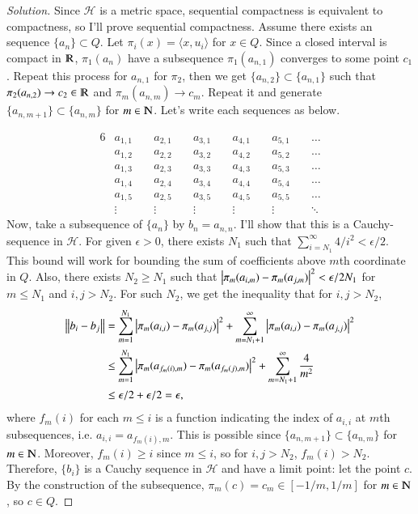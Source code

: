 \documentclass[a4paper, 12pt]{article}
\theoremstyle{Mydefinition}
\theoremstyle{Mytheorem}
\begin{document}
\begin{proof}[Solution]
Since $\mathscr{H}$ is a metric space, sequential compactness is equivalent to compactness, so I'll prove sequential compactness. Assume there exists an sequence $\{a_n\}\subset Q$. Let $\pi_i (x) = \langle x, u_i\rangle$ for $x\in Q$. Since a closed interval is compact in $\varmathbb{R}$, $\pi_1(a_n)$ have a subsequence $\pi_1(a_{n,1})$ converges to some point $c_1$. Repeat this process for $a_{n,1}$ for $\pi_2$, then we get $\{a_{n,2}\}\subset \{a_{n,1}\}$ such that $\pi_2(a_{n,2})\rightarrow c_2\in \varmathbb{R}$ and $\pi_m(a_{n,m})\rightarrow c_m$. Repeat it and generate $\{a_{n,m+1}\}\subset \{a_{n,m}\}$ for $m\in\varmathbb{N}$. Let's write each sequences as below.

\begin{alignat*}{6}
& a_{1,1} & \;& a_{2,1} &\;& a_{3,1} &\;& a_{4,1} &\;& a_{5,1} &\;& \ldots \\
& a_{1,2} &\; & a_{2,2} &\;& a_{3,2} &\;& a_{4,2} &\;& a_{5,2} &\;& \ldots \\
& a_{1,3} &\; & a_{2,3} &\;& a_{3,3} &\;& a_{4,3} &\;& a_{5,3} &\;& \ldots \\
& a_{1,4} &\; & a_{2,4} &\;& a_{3,4} &\;& a_{4,4} &\;& a_{5,4} &\;& \ldots \\
& a_{1,5} &\; & a_{2,5} &\;& a_{3,5} &\;& a_{4,5} &\;& a_{5,5} &\;& \ldots \\
& \vdots &\; & \vdots &\;& \vdots &\;& \vdots &\;& \vdots &\;& \ddots
\end{alignat*}
Now, take a subsequence of $\{a_n\}$ by $b_{n} = a_{n, n}$. I'll show that this is a Cauchy-sequence in $\mathscr{H}$. For given $\epsilon>0$, there exists $N_1$ such that $\sum_{i=N_1}^\infty 4/i^2<\epsilon/2$. This bound will work for bounding the sum of coefficients above $m$th coordinate in $Q$. Also, there exists $N_2\geq N_1$ such that $\abs{\pi_m(a_{i,m})-\pi_m(a_{j,m})}^2<\epsilon/2N_1$ for $m\leq N_1$ and $i,j>N_2$. For such $N_2$, we get the inequality that for $i,j>N_2$,
\begin{equation}
\begin{split}
  \norm{b_i-b_j}&= \sum_{m=1}^{N_1} \abs{\pi_m(a_{i,i})-\pi_m(a_{j,j})}^2 + \sum_{m=N_1+1}^\infty \abs{\pi_m(a_{i,i})-\pi_m(a_{j,j})}^2 \\
  &\leq \sum_{m=1}^{N_1}  \abs{\pi_m(a_{f_m(i),m})-\pi_m(a_{f_m(j),m})}^2 + \sum_{m=N_1+1}^\infty \frac{4}{m^2} \\
  &\leq \epsilon/2 + \epsilon/2 = \epsilon,
\end{split}
\end{equation}
where $f_m(i)$ for each $m\leq i$ is a function indicating the index of $a_{i,i}$ at $m$th subsequences, i.e. $a_{i,i} = a_{f_m(i), m}$. This is possible since $\{a_{n,m+1}\}\subset \{a_{n,m}\}$ for $m\in\varmathbb{N}$. Moreover, $f_m(i)\geq i$ since $m\leq i$, so for $i,j>N_2$, $f_m(i)>N_2$. Therefore, $\{b_i\}$ is a Cauchy sequence in $\mathscr{H}$ and have a limit point: let the point $c$. By the construction of the subsequence, $\pi_m(c) = c_m\in [-1/m, 1/m]$ for $m\in \varmathbb{N}$, so $c\in Q$.
\end{proof}
\end{document}
